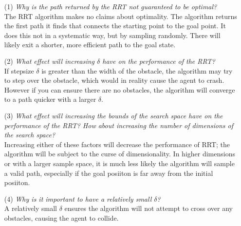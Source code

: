 \documentclass{article}
\begin{document}
    \begin{enumerate}
        \item[(1)] \textit{Why is the path returned by the RRT not guaranteed to be optimal?} \\
                    The RRT algorithm makes no claims about optimality. The algorithm returns the first path it finds that connects the starting point to the goal point. It does this not in a systematic way, but by sampling randomly.  There will likely exit a shorter, more efficient path to the goal state.
        \item[(2)] \textit{What effect will increasing $\delta$ have on the performance of the RRT?} \\
                    If stepsize $\delta$ is greater than the width of the obstacle, the algorithm may try to step over the obstacle, which would in reality cause the agent to crash.  However if you can ensure there are no obstacles, the algorithm will converge to a path quicker with a larger $\delta$. 
        \item[(3)] \textit{What effect will increasing the bounds of the search space have on the performance
        of the RRT? How about increasing the number of dimensions of the search space?} \\
                    Increasing either of these factors will decrease the performance of RRT; the algorithm will be subject to the curse of dimensionality. In higher dimensions or with a larger sample space, it is much less likely the algorithm will sample a valid path, especially if the goal posiiton is far away from the initial posiiton.
        \item[(4)] \textit{Why is it important to have a relatively small $\delta$?} \\
                    A relatively small $\delta$ ensures the algorithm will not attempt to cross over any obstacles, causing the agent to collide.
    \end{enumerate}
\end{document}
